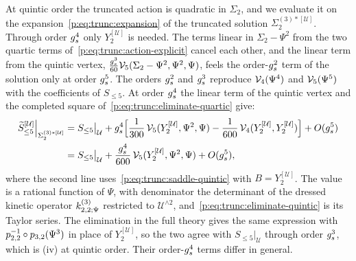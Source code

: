 At quintic order the truncated action is quadratic in $\Sigma_2$, and we evaluate it on the expansion~\eqref{p:eq:trunc:expansion} of the truncated solution $\Sigma_2^{(3)*[\mathcal U]}$.
Through order $\gs^4$ only $Y_2^{[\mathcal U]}$ is needed.
The terms linear in $\Sigma_2 - \Psi^2$ from the two quartic terms of~\eqref{p:eq:trunc:action-explicit} cancel each other, and the linear term from the quintic vertex, $\tfrac{\gs^3}{60} \vertex{5}(\Sigma_2 - \Psi^2, \Psi^2, \Psi)$, feels the order-$\gs^2$ term of the solution only at order $\gs^5$.
The orders $\gs^2$ and $\gs^3$ reproduce $\vertex{4}(\Psi^4)$ and $\vertex{5}(\Psi^5)$ with the coefficients of $S_{\le 5}$.
At order $\gs^4$ the linear term of the quintic vertex and the completed square of~\eqref{p:eq:trunc:eliminate-quartic} give:
\begin{equation}
  \label{p:eq:trunc:eliminate-quintic}
  \begin{aligned}
    \caction[\le 5]^{[\mathcal U]} \Big|_{\Sigma_2^{(3)*[\mathcal U]}}
      &
      = S_{\le 5} \big|_{\mathcal U}
        + \gs^4 \Big[
          \frac{1}{300} \, \vertex{5}(Y_2^{[\mathcal U]}, \Psi^2, \Psi)
          - \frac{1}{600} \, \vertex{4}(Y_2^{[\mathcal U]}, Y_2^{[\mathcal U]})
        \Big]
        + O(\gs^5)
      \\
      &
      = S_{\le 5} \big|_{\mathcal U}
        + \frac{\gs^4}{600} \, \vertex{5}(Y_2^{[\mathcal U]}, \Psi^2, \Psi)
        + O(\gs^5),
  \end{aligned}
\end{equation}
where the second line uses~\eqref{p:eq:trunc:saddle-quintic} with $B = Y_2^{[\mathcal U]}$.
The value is a rational function of $\Psi$, with denominator the determinant of the dressed kinetic operator $\kin{2}{\Psi}{3}$ restricted to $\mathcal U^{\wedge 2}$, and~\eqref{p:eq:trunc:eliminate-quintic} is its Taylor series.
The elimination in the full theory gives the same expression with $\sprod{2}{2}^{-1} \circ \sprod{3}{2}(\Psi^3)$ in place of $Y_2^{[\mathcal U]}$, so the two agree with $S_{\le 5}|_{\mathcal U}$ through order $\gs^3$, which is (iv) at quintic order.
Their order-$\gs^4$ terms differ in general.

